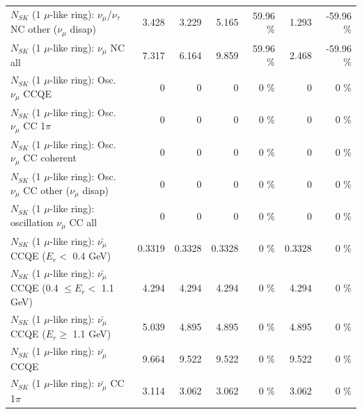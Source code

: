 \begin{table}
\begin{tabular}{| l | r | r | r  r | r  r |}
   $N_{SK}$ (1 $\mu$-like ring): $\nu_\mu$/$\nu_\tau$ NC other ($\nu_\mu$ disap) &           3.428 &           3.229 &           5.165 &    59.96 \%  &           1.293 &   -59.96 \%  \\ 
                                $N_{SK}$ (1 $\mu$-like ring): $\nu_{\mu}$ NC all &           7.317 &           6.164 &           9.859 &    59.96 \%  &           2.468 &   -59.96 \%  \\ 
\hline
\hline
                               $N_{SK}$ (1 $\mu$-like ring): Osc. $\nu_\mu$ CCQE &               0 &               0 &               0 &        0 \%  &               0 &        0 \%  \\ 
                          $N_{SK}$ (1 $\mu$-like ring): Osc. $\nu_\mu$ CC 1$\pi$ &               0 &               0 &               0 &        0 \%  &               0 &        0 \%  \\ 
                        $N_{SK}$ (1 $\mu$-like ring): Osc. $\nu_\mu$ CC coherent &               0 &               0 &               0 &        0 \%  &               0 &        0 \%  \\ 
         $N_{SK}$ (1 $\mu$-like ring): Osc. $\nu_\mu$ CC other ($\nu_\mu$ disap) &               0 &               0 &               0 &        0 \%  &               0 &        0 \%  \\ 
                      $N_{SK}$ (1 $\mu$-like ring): oscillation $\nu_\mu$ CC all &               0 &               0 &               0 &        0 \%  &               0 &        0 \%  \\ 
\hline
\hline
          $N_{SK}$ (1 $\mu$-like ring): $\bar{\nu_\mu}$ CCQE ($E_{r} <$ 0.4 GeV) &          0.3319 &          0.3328 &          0.3328 &        0 \%  &          0.3328 &        0 \%  \\ 
 $N_{SK}$ (1 $\mu$-like ring): $\bar{\nu_\mu}$ CCQE (0.4 $\leq E_{r} <$ 1.1 GeV) &           4.294 &           4.294 &           4.294 &        0 \%  &           4.294 &        0 \%  \\ 
       $N_{SK}$ (1 $\mu$-like ring): $\bar{\nu_\mu}$ CCQE ($E_{r} \geq$ 1.1 GeV) &           5.039 &           4.895 &           4.895 &        0 \%  &           4.895 &        0 \%  \\ 
\hline
                              $N_{SK}$ (1 $\mu$-like ring): $\bar{\nu_\mu}$ CCQE &           9.664 &           9.522 &           9.522 &        0 \%  &           9.522 &        0 \%  \\ 
                         $N_{SK}$ (1 $\mu$-like ring): $\bar{\nu_\mu}$ CC 1$\pi$ &           3.114 &           3.062 &           3.062 &        0 \%  &           3.062 &        0 \%  \\ 

\end{tabular}
\end{table}
